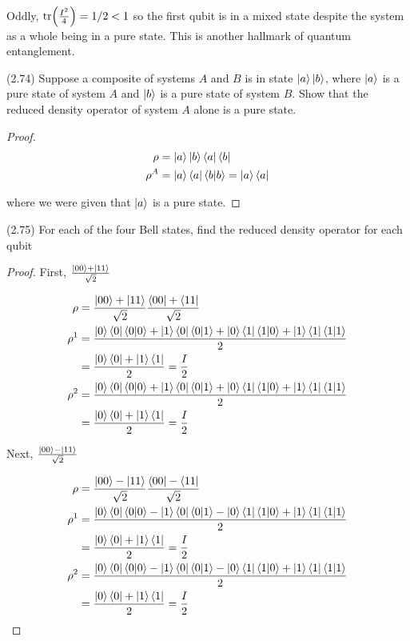\documentclass[main.tex]{subfiles}
\begin{document}
\begin{subappendices}
Oddly, $\tr(\frac{I^2}{4}) = 1/2 < 1$ so the first qubit is in a mixed state despite the system as a whole being in a pure state. This is another hallmark of quantum entanglement. 

\begin{exercise}
(2.74) Suppose a composite of systems $A$ and $B$ is in state $\ket{a}\ket{b}$, where $\ket{a}$ is a pure state of system $A$ and $\ket{b}$ is a pure state of system $B$. Show that the reduced density operator of system $A$ alone is a pure state.
\begin{proof}
\begin{align*}
\rho &= \ket{a}\ket{b}\bra{a}\bra{b} \\
\rho^A &= \ket{a}\bra{a}\bra{b}\ket{b} = \ket{a}\bra{a}
\end{align*}

where we were given that $\ket{a}$ is a pure state.
\end{proof}	
\end{exercise}

\begin{exercise}
(2.75) For each of the four Bell states, find the reduced density operator for each qubit
\begin{proof}

First, $\frac{\ket{00} + \ket{11}}{\sqrt{2}}$

\begin{align*}
\rho &= \frac{\ket{00} + \ket{11}}{\sqrt{2}}\frac{\bra{00} + \bra{11}}{\sqrt{2}} \\
\rho^1 &= \frac{\ket{0}\bra{0}\bra{0}\ket{0}+\ket{1}\bra{0}\bra{0}\ket{1}+ \ket{0}\bra{1}\bra{1}\ket{0}+ \ket{1}\bra{1}\bra{1}\ket{1}}{2} \\
&= \frac{\ket{0}\bra{0} + \ket{1}\bra{1}}{2} = \frac{I}{2} \\
\rho^2 &= \frac{\ket{0}\bra{0}\bra{0}\ket{0}+\ket{1}\bra{0}\bra{0}\ket{1}+ \ket{0}\bra{1}\bra{1}\ket{0}+ \ket{1}\bra{1}\bra{1}\ket{1}}{2} \\
&= \frac{\ket{0}\bra{0} + \ket{1}\bra{1}}{2} = \frac{I}{2}
\end{align*}

Next, $\frac{\ket{00} - \ket{11} }{\sqrt{2}}$	

\begin{align*}
\rho &= \frac{\ket{00} - \ket{11}}{\sqrt{2}}\frac{\bra{00} - \bra{11}}{\sqrt{2}} \\
\rho^1 &= \frac{\ket{0}\bra{0}\bra{0}\ket{0}-\ket{1}\bra{0}\bra{0}\ket{1}- \ket{0}\bra{1}\bra{1}\ket{0}+ \ket{1}\bra{1}\bra{1}\ket{1}}{2} \\
&= \frac{\ket{0}\bra{0} + \ket{1}\bra{1}}{2} = \frac{I}{2} \\
\rho^2 &= \frac{\ket{0}\bra{0}\bra{0}\ket{0}-\ket{1}\bra{0}\bra{0}\ket{1}- \ket{0}\bra{1}\bra{1}\ket{0}+ \ket{1}\bra{1}\bra{1}\ket{1}}{2} \\
&= \frac{\ket{0}\bra{0} + \ket{1}\bra{1}}{2} = \frac{I}{2}
\end{align*}


\end{proof}
\end{exercise}
\end{subappendices}
\end{document}
